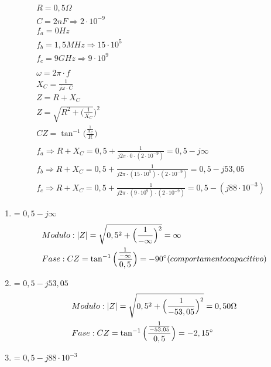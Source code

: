 \documentclass[fleqn]{exam}
\begin{document}
\begin{enumerate}
\begin{center}
        \end{center}
        \begin{align*}
            &R = 0,5\Omega \\
            &C = 2nF \Rightarrow 2\cdot 10^{-9} \\ 
            &f_a = 0Hz \\
            &f_b = 1,5MHz \Rightarrow 15\cdot 10^5 \\
            &f_c = 9GHz \Rightarrow 9\cdot 10^9 \\ \\
            &\omega = 2\pi\cdot f \\
            &X_C = \frac{1}{j\omega \cdot C} \\
            &Z = R+X_C \\
            &Z = \sqrt{R^2+\Big(\frac{1}{X_C}}\Big)^2 \\
            &CZ = \tan^{-1}\Big(\frac{\frac{1}{X_C}}{R}\Big)\\ \\
            &f_a \Rightarrow R+X_C = 0,5 + \frac{1}{j2\pi\cdot 0\cdot (2\cdot 10^{-9})}= 0,5 - j\infty\\
            &f_b \Rightarrow R+X_C = 0,5 + \frac{1}{j2\pi\cdot (15\cdot 10^5)\cdot (2\cdot 10^{-9})}= 0,5-j53,05\\
            &f_c \Rightarrow R+X_C = 0,5 + \frac{1}{j2\pi\cdot (9\cdot 10^9)\cdot (2\cdot 10^{-9})}= 0,5-(j88\cdot 10^{-3})
        \end{align*}
        \begin{enumerate}
            \item = $0,5 -j\infty$
            \begin{align*}
                &Modulo: |Z| = \sqrt{0,5^2+\Big(\frac{1}{-\infty}\Big)^2}= \infty \\
                &Fase: CZ = \tan^{-1} \Big(\frac{\frac{1}{-\infty}}{0,5}\Big)= -90\degree (comportamento capacitivo)
            \end{align*}
            \item = $0,5 -j53,05$
            \begin{align*}
                &Modulo: |Z| = \sqrt{0,5^2+\Big(\frac{1}{-53,05}\Big)^2}= 0,50\Omega \\
                &Fase: CZ = \tan^{-1} \Big(\frac{\frac{1}{-53,05}}{0,5}\Big)= -2,15\degree
            \end{align*}
            \item = $0,5 -j88\cdot 10^{-3}$
            \begin{align*}

\end{align*}
\end{enumerate}
\end{enumerate}
\end{document}
